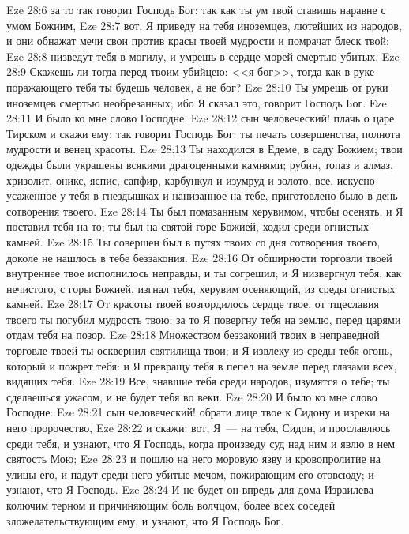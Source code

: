 \vs Eze 28:6 за то так говорит Господь Бог: так как ты ум твой ставишь наравне с умом Божиим,
\vs Eze 28:7 вот, Я приведу на тебя иноземцев, лютейших из народов, и они обнажат мечи свои против красы твоей мудрости и помрачат блеск твой;
\vs Eze 28:8 низведут тебя в могилу, и умрешь в сердце морей смертью убитых.
\vs Eze 28:9 Скажешь ли тогда перед твоим убийцею: <<я бог>>, тогда как в руке поражающего тебя ты будешь человек, а не бог?
\vs Eze 28:10 Ты умрешь от руки иноземцев смертью необрезанных; ибо Я сказал это, говорит Господь Бог.
\vs Eze 28:11 И было ко мне слово Господне:
\vs Eze 28:12 сын человеческий! плачь о царе Тирском и скажи ему: так говорит Господь Бог: ты печать совершенства, полнота мудрости и венец красоты.
\vs Eze 28:13 Ты находился в Едеме, в саду Божием; твои одежды были украшены всякими драгоценными камнями; рубин, топаз и алмаз, хризолит, оникс, яспис, сапфир, карбункул и изумруд и золото, все, искусно усаженное у тебя в гнездышках и нанизанное на тебе, приготовлено было в день сотворения твоего.
\vs Eze 28:14 Ты был помазанным херувимом, чтобы осенять, и Я поставил тебя на то; ты был на святой горе Божией, ходил среди огнистых камней.
\vs Eze 28:15 Ты совершен был в путях твоих со дня сотворения твоего, доколе не нашлось в тебе беззакония.
\vs Eze 28:16 От обширности торговли твоей внутреннее твое исполнилось неправды, и ты согрешил; и Я низвергнул тебя, как нечистого, с горы Божией, изгнал тебя, херувим осеняющий, из среды огнистых камней.
\vs Eze 28:17 От красоты твоей возгордилось сердце твое, от тщеславия твоего ты погубил мудрость твою; за то Я повергну тебя на землю, перед царями отдам тебя на позор.
\vs Eze 28:18 Множеством беззаконий твоих в неправедной торговле твоей ты осквернил святилища твои; и Я извлеку из среды тебя огонь, который и пожрет тебя: и Я превращу тебя в пепел на земле перед глазами всех, видящих тебя.
\vs Eze 28:19 Все, знавшие тебя среди народов, изумятся о тебе; ты сделаешься ужасом, и не будет тебя во веки.
\rsbpar\vs Eze 28:20 И было ко мне слово Господне:
\vs Eze 28:21 сын человеческий! обрати лице твое к Сидону и изреки на него пророчество,
\vs Eze 28:22 и скажи: вот, Я~--- на тебя, Сидон, и прославлюсь среди тебя, и узнают, что Я Господь, когда произведу суд над ним и явлю в нем святость Мою;
\vs Eze 28:23 и пошлю на него моровую язву и кровопролитие на улицы его, и падут среди него убитые мечом, пожирающим его отовсюду; и узнают, что Я Господь.
\vs Eze 28:24 И не будет он впредь для дома Израилева колючим терном и причиняющим боль волчцом, более всех соседей зложелательствующим ему, и узнают, что Я Господь Бог.
